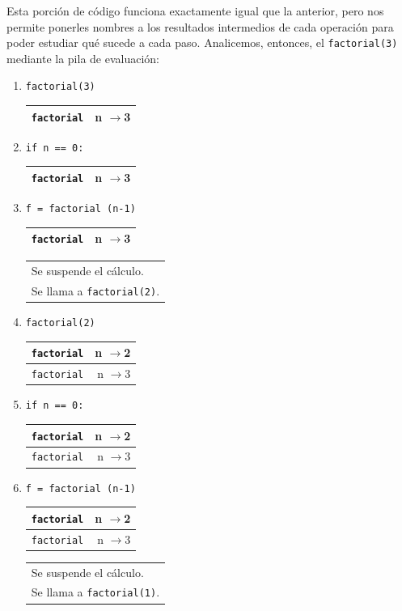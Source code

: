 Esta porción de código funciona exactamente igual que la anterior, pero nos
permite ponerles nombres a los resultados intermedios de cada operación
para poder estudiar qué sucede a cada paso.
Analicemos, entonces, el \lstinline|factorial(3)|  mediante la pila de
evaluación:

\begin{enumerate}

\item  \verb|factorial(3)              |
	\begin{tabular}{r|r|}
	\hline
	\verb|factorial|&n $\rightarrow$3\\
	\hline
	\end{tabular}

\item  \verb|if n == 0:                |
	\begin{tabular}{r|r|}
	\hline
	\verb|factorial|&n $\rightarrow$3\\
	\hline
	\end{tabular}

\item  \verb|f = factorial (n-1)       |
	\begin{tabular}{r|r|}
	\hline
	\verb|factorial|&n $\rightarrow$3\\
	\hline
	\end{tabular}
	\begin{tabular}{l}
	Se suspende el cálculo. \\
	Se llama a \verb|factorial(2)|.
	\end{tabular}

\item  \verb|factorial(2)              |
	\begin{tabular}{r|r|}
	\hline
	\verb|factorial|&n $\rightarrow$2\\
	\hline
	\hline
	\verb|factorial|&n $\rightarrow$3\\
	\hline
	\end{tabular}

\item  \verb|if n == 0:                |
	\begin{tabular}{r|r|}
	\hline
	\verb|factorial|&n $\rightarrow$2\\
	\hline
	\hline
	\verb|factorial|&n $\rightarrow$3\\
	\hline
	\end{tabular}

\item  \verb|f = factorial (n-1)       |
	\begin{tabular}{r|r|}
	\hline
	\verb|factorial|&n $\rightarrow$2\\
	\hline
	\hline
	\verb|factorial|&n $\rightarrow$3\\
	\hline
	\end{tabular}
	\begin{tabular}{l}
	Se suspende el cálculo. \\
	Se llama a \verb|factorial(1)|.
	\end{tabular}


\end{enumerate}
